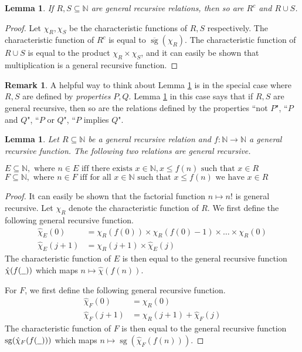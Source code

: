 \documentclass[12pt]{article}
\theoremstyle{plain}
\newtheorem{lemma}[thm]{Lemma}
\theoremstyle{definition}
\newtheorem{remark}[thm]{Remark}
\newcommand{\bb}[1]{\mathbb{#1}}
\newcommand{\und}[1]{\underline{\hspace{#1 cm}}}
\newcommand{\lto}{\longrightarrow}
\begin{document}
	\begin{lemma}\label{lem:and_or}
		If $R,S \subseteq \bb{N}$ are general recursive relations, then so are $R^c$ and $R \cup S$.
	\end{lemma}
	\begin{proof}
		Let $\chi_R,\chi_S$ be the characteristic functions of $R,S$ respectively. The characteristic function of $R^c$ is equal to $\overline{\operatorname{sg}}(\chi_R)$. The characteristic function of $R \cup S$ is equal to the product $\chi_R \times \chi_S$, and it can easily be shown that multiplication is a general recursive function.
	\end{proof}
	\begin{remark}
		A helpful way to think about Lemma \ref{lem:and_or} is in the special case where $R,S$ are defined by \emph{properties} $P,Q$. Lemma \ref{lem:and_or} in this case says that if $R,S$ are general recursive, then so are the relations defined by the properties ``not $P$", ``$P$ and $Q$", ``$P$ or $Q$", ``$P$ implies $Q$".
	\end{remark}
	\begin{lemma}
		Let $R \subseteq \bb{N}$ be a general recursive relation and $f: \bb{N} \lto \bb{N}$ a general recursive function. The following two relations are general recursive.
		\begin{center}
			$E \subseteq \bb{N},\text{ where }n \in E\text{ iff there exists }x \in \bb{N}, x \leq f(n)\text{ such that }x \in R$\\
			$F \subseteq \bb{N},\text{ where }n \in F\text{ iff for all }x\in \bb{N}\text{ such that }x \leq f(n)\text{ we have }x \in R$
		\end{center}
	\end{lemma}
	\begin{proof}
		It can easily be shown that the factorial function $n \longmapsto n!$ is general recursive. Let $\chi_R$ denote the characteristic function of $R$. We first define the following general recursive function.
		\begin{align*}
			\hat{\chi}_E(0) &= \chi_R(f(0)) \times \chi_R(f(0) - 1) \times \hdots \times \chi_R(0)\\
			\hat{\chi}_E(j+1) &= \chi_R(j+1) \times \hat{\chi}_E(j)
		\end{align*}
		The characteristic function of $E$ is then equal to the general recursive function $\hat{\chi}(f(\und{0.2}))$ which maps $n \longmapsto \hat{\chi}(f(n))$.
		
		For $F$, we first define the following general recursive function.
		\begin{align*}
			\hat{\chi}_F(0) &= \chi_R(0)\\
			\hat{\chi}_F(j+1) &= \chi_R(j+1) + \hat{\chi}_F(j)
		\end{align*}
		The characteristic function of $F$ is then equal to the general recursive function $\operatorname{sg}(\hat{\chi}_F(f(\und{0.2})))$ which maps $n \longmapsto \operatorname{sg}(\hat{\chi}_F(f(n)))$.
	\end{proof}
	
\end{document}

